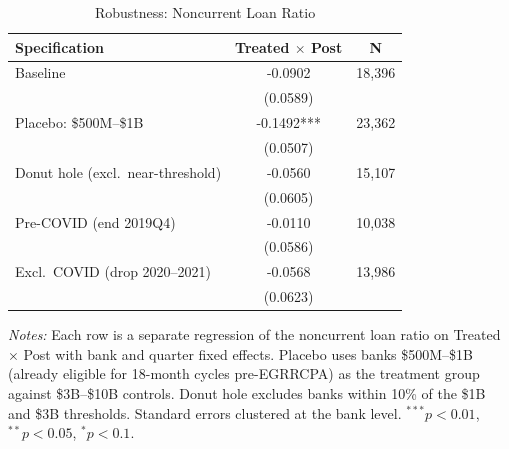 \begin{table}[t]
\centering
\caption{Robustness: Noncurrent Loan Ratio}
\label{tab:robustness}
\small
\begin{threeparttable}
\begin{tabular}{lcc}
\toprule
Specification & Treated $\times$ Post & N \\
\midrule
Baseline & -0.0902 & 18,396 \\
& (0.0589) & \\
Placebo: \$500M--\$1B & -0.1492*** & 23,362 \\
& (0.0507) & \\
Donut hole (excl.\ near-threshold) & -0.0560 & 15,107 \\
& (0.0605) & \\
Pre-COVID (end 2019Q4) & -0.0110 & 10,038 \\
& (0.0586) & \\
Excl.\ COVID (drop 2020--2021) & -0.0568 & 13,986 \\
& (0.0623) & \\
\bottomrule
\end{tabular}
\begin{tablenotes}
\item \textit{Notes:} Each row is a separate regression of the noncurrent loan ratio on Treated $\times$ Post with bank and quarter fixed effects. Placebo uses banks \$500M--\$1B (already eligible for 18-month cycles pre-EGRRCPA) as the treatment group against \$3B--\$10B controls. Donut hole excludes banks within 10\% of the \$1B and \$3B thresholds. Standard errors clustered at the bank level. $^{***}p<0.01$, $^{**}p<0.05$, $^{*}p<0.1$.
\end{tablenotes}
\end{threeparttable}
\end{table}
